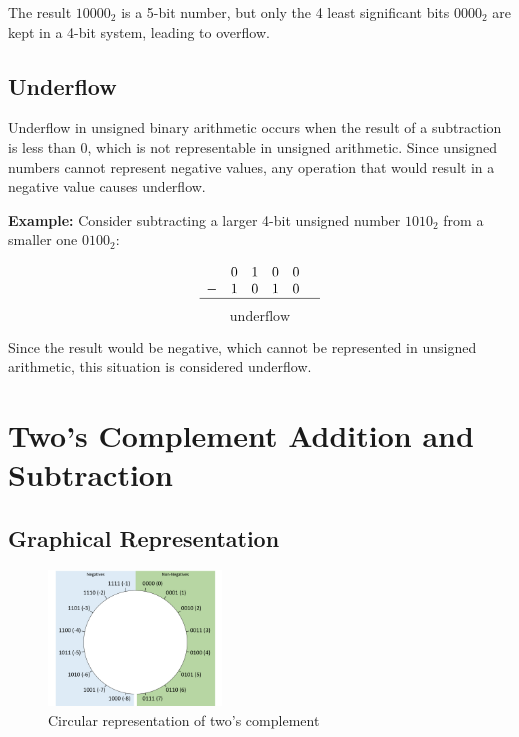 \documentclass[12pt,openany]{book}
\begin{document}
	The result \(10000_2\) is a 5-bit number, but only the 4 least significant bits \(0000_2\) are kept in a 4-bit system, leading to overflow.
	\subsection{Underflow}
	
	Underflow in unsigned binary arithmetic occurs when the result of a subtraction is less than 0, which is not representable in unsigned arithmetic. Since unsigned numbers cannot represent negative values, any operation that would result in a negative value causes underflow.
	
	\textbf{Example:} Consider subtracting a larger 4-bit unsigned number \(1010_2\) from a smaller one \(0100_2\):
	
	\[
		\begin{array}{cccccc}
			  & 0 & 1 & 0 & 0 &   \\
			- & 1 & 0 & 1 & 0 &   \\
			\hline
		\end{array}\]
		\vspace{-15px}
		\begin{align*}
			\text{underflow} 
		\end{align*} 
		
		Since the result would be negative, which cannot be represented in unsigned arithmetic, this situation is considered underflow.
		
		\newpage
		\section{Two’s Complement
		Addition and Subtraction}
		\subsection*{Graphical Representation}
		
		\begin{figure} %
			\centering
			\includegraphics[width=0.41\textwidth]{circle-twoscomplement.png} %
			\caption*{Circular representation of two's complement}
		\end{figure}
		
\end{document}
